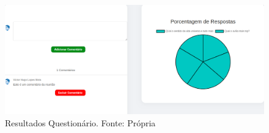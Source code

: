 \begin{figure}[H]
    \centering
    \includegraphics[width=1.0\textwidth]{figuras/resultados_questionario.png}
    \caption{Resultados Questionário. Fonte: Própria}
    \label{img:resultados_questionario}
\end{figure}